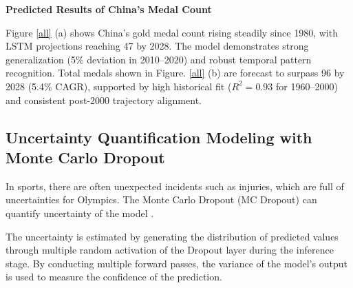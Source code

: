\documentclass{mcmthesis}
\begin{document}
\textbf{Predicted Results of China’s Medal Count}

Figure \ref{all} (a) shows China's gold medal count rising steadily since 1980, with LSTM projections reaching 47 by 2028. The model demonstrates strong generalization (5\% deviation in 2010–2020) and robust temporal pattern recognition. Total medals shown in Figure. \ref{all} (b) are forecast to surpass 96 by 2028 (5.4\% CAGR), supported by high historical fit ($R^2=0.93$ for 1960–2000) and consistent post-2000 trajectory alignment.


\subsection{Uncertainty Quantification Modeling with Monte Carlo Dropout}

In sports, there are often unexpected incidents such as injuries, which are full of uncertainties for Olympics. The Monte Carlo Dropout (MC Dropout) can quantify uncertainty of the model \cite{gal2016dropout}.

The uncertainty is estimated by generating the distribution of predicted values through multiple random activation of the Dropout layer during the inference stage. By conducting multiple forward passes, the variance of the model's output is used to measure the confidence of the prediction.
\end{document}
